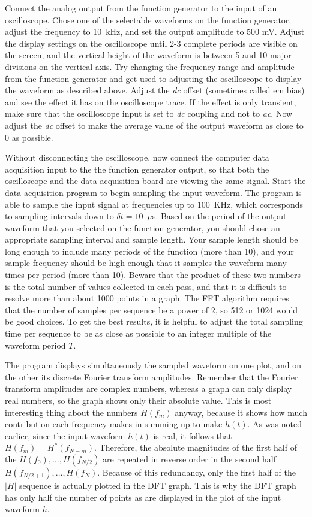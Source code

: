 \documentclass{revtex4}
\begin{document}
Connect the analog output from the function generator to the input of an
oscilloscope.  Chose one of the selectable waveforms on the function
generator, adjust the frequency to 10~kHz, and set the output amplitude
to 500 mV.  Adjust the display settings on the oscilloscope until 2-3
complete periods are visible on the screen, and the vertical height of
the waveform is between 5 and 10 major divisions on the vertical axis.
Try changing the frequency range and amplitude from the function generator
and get used to adjusting the oscilloscope to display the waveform as
described above.  Adjust the {\em dc} offset (sometimes called {em bias})
and see the effect it has on the oscilloscope trace.  If the effect is
only transient, make sure that the oscilloscope input is set to {\em dc}
coupling and not to {\em ac}.  Now adjust the {\em dc} offset to make the
average value of the output waveform as close to 0 as possible.

Without disconnecting the oscilloscope, now connect the computer data
acquisition input to the the function generator output, so that both the
oscilloscope and the data acquisition board are viewing the same signal.
Start the data acquisition program to begin sampling the input waveform.
The program is able to sample the input signal at frequencies up to
100~KHz, which corresponds to sampling intervals down to $\delta t=10$~$\mu$s.
Based on the period of the output waveform that you selected on the
function generator, you should chose an appropriate sampling interval
and sample length.  Your sample length should be long enough to include
many periods of the function (more than 10), and your sample frequency
should be high enough that it samples the waveform many times per period
(more than 10).  Beware that the product of these two numbers is the
total number of values collected in each pass, and that it is difficult
to resolve more than about 1000 points in a graph.  The FFT algorithm
requires that the number of samples per sequence be a power of 2, so
512 or 1024 would be good choices.  To get the best results, it is
helpful to adjust the total sampling time per sequence to be as close
as possible to an integer multiple of the waveform period $T$.

The program displays simultaneously the sampled waveform on one plot, and
on the other its discrete Fourier transform amplitudes.  Remember that the
Fourier transform amplitudes are complex numbers, whereas a graph can only
display real numbers, so the graph shows only their absolute value.  This
is most interesting thing about the numbers $H(f_m)$ anyway, because it
shows how much contribution each frequency makes in summing up to make $h(t)$.
As was noted earlier, since the input waveform $h(t)$ is real,
it follows that $H(f_m)=H^*(f_{N-m})$.  Therefore, the absolute magnitudes
of the first half of the $H(f_0),\ldots,H(f_{N/2})$ are repeated in reverse
order in the second half $H(f_{N/2+1}),\ldots,H(f_N)$.  Because of this
redundancy, only the first half of the $|H|$ sequence is actually plotted in
the DFT graph.  This is why the DFT graph has only half the number of points
as are displayed in the plot of the input waveform $h$.
\end{document}
